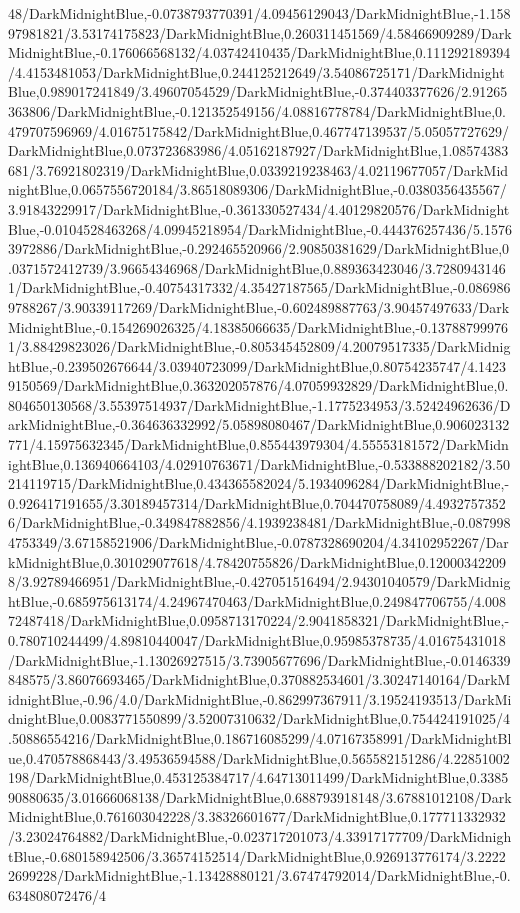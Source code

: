 {\begin{tikzternal}
48/DarkMidnightBlue,-0.0738793770391/4.09456129043/DarkMidnightBlue,-1.15897981821/3.53174175823/DarkMidnightBlue,0.260311451569/4.58466909289/DarkMidnightBlue,-0.176066568132/4.03742410435/DarkMidnightBlue,0.111292189394/4.4153481053/DarkMidnightBlue,0.244125212649/3.54086725171/DarkMidnightBlue,0.989017241849/3.49607054529/DarkMidnightBlue,-0.374403377626/2.91265363806/DarkMidnightBlue,-0.121352549156/4.08816778784/DarkMidnightBlue,0.479707596969/4.01675175842/DarkMidnightBlue,0.467747139537/5.05057727629/DarkMidnightBlue,0.073723683986/4.05162187927/DarkMidnightBlue,1.08574383681/3.76921802319/DarkMidnightBlue,0.0339219238463/4.02119677057/DarkMidnightBlue,0.0657556720184/3.86518089306/DarkMidnightBlue,-0.0380356435567/3.91843229917/DarkMidnightBlue,-0.361330527434/4.40129820576/DarkMidnightBlue,-0.0104528463268/4.09945218954/DarkMidnightBlue,-0.444376257436/5.15763972886/DarkMidnightBlue,-0.292465520966/2.90850381629/DarkMidnightBlue,0.0371572412739/3.96654346968/DarkMidnightBlue,0.889363423046/3.72809431461/DarkMidnightBlue,-0.40754317332/4.35427187565/DarkMidnightBlue,-0.0869869788267/3.90339117269/DarkMidnightBlue,-0.602489887763/3.90457497633/DarkMidnightBlue,-0.154269026325/4.18385066635/DarkMidnightBlue,-0.137887999761/3.88429823026/DarkMidnightBlue,-0.805345452809/4.20079517335/DarkMidnightBlue,-0.239502676644/3.03940723099/DarkMidnightBlue,0.80754235747/4.14239150569/DarkMidnightBlue,0.363202057876/4.07059932829/DarkMidnightBlue,0.804650130568/3.55397514937/DarkMidnightBlue,-1.1775234953/3.52424962636/DarkMidnightBlue,-0.364636332992/5.05898080467/DarkMidnightBlue,0.906023132771/4.15975632345/DarkMidnightBlue,0.855443979304/4.55553181572/DarkMidnightBlue,0.136940664103/4.02910763671/DarkMidnightBlue,-0.533888202182/3.50214119715/DarkMidnightBlue,0.434365582024/5.1934096284/DarkMidnightBlue,-0.926417191655/3.30189457314/DarkMidnightBlue,0.704470758089/4.49327573526/DarkMidnightBlue,-0.349847882856/4.1939238481/DarkMidnightBlue,-0.0879984753349/3.67158521906/DarkMidnightBlue,-0.0787328690204/4.34102952267/DarkMidnightBlue,0.301029077618/4.78420755826/DarkMidnightBlue,0.120003422098/3.92789466951/DarkMidnightBlue,-0.427051516494/2.94301040579/DarkMidnightBlue,-0.685975613174/4.24967470463/DarkMidnightBlue,0.249847706755/4.00872487418/DarkMidnightBlue,0.0958713170224/2.9041858321/DarkMidnightBlue,-0.780710244499/4.89810440047/DarkMidnightBlue,0.95985378735/4.01675431018/DarkMidnightBlue,-1.13026927515/3.73905677696/DarkMidnightBlue,-0.0146339848575/3.86076693465/DarkMidnightBlue,0.370882534601/3.30247140164/DarkMidnightBlue,-0.96/4.0/DarkMidnightBlue,-0.862997367911/3.19524193513/DarkMidnightBlue,0.0083771550899/3.52007310632/DarkMidnightBlue,0.754424191025/4.50886554216/DarkMidnightBlue,0.186716085299/4.07167358991/DarkMidnightBlue,0.470578868443/3.49536594588/DarkMidnightBlue,0.565582151286/4.22851002198/DarkMidnightBlue,0.453125384717/4.64713011499/DarkMidnightBlue,0.338590880635/3.01666068138/DarkMidnightBlue,0.688793918148/3.67881012108/DarkMidnightBlue,0.761603042228/3.38326601677/DarkMidnightBlue,0.177711332932/3.23024764882/DarkMidnightBlue,-0.023717201073/4.33917177709/DarkMidnightBlue,-0.680158942506/3.36574152514/DarkMidnightBlue,0.926913776174/3.22222699228/DarkMidnightBlue,-1.13428880121/3.67474792014/DarkMidnightBlue,-0.634808072476/4
\end{tikzternal}}
